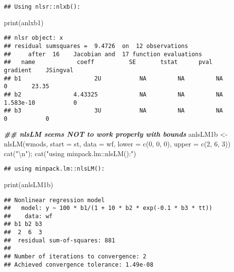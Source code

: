 \documentclass[
]{article}
\newenvironment{Shaded}{\begin{snugshade}}{\end{snugshade}}
\newcommand{\AttributeTok}[1]{\textcolor[rgb]{0.77,0.63,0.00}{#1}}
\newcommand{\DecValTok}[1]{\textcolor[rgb]{0.00,0.00,0.81}{#1}}
\newcommand{\DocumentationTok}[1]{\textcolor[rgb]{0.56,0.35,0.01}{\textbf{\textit{#1}}}}
\newcommand{\FunctionTok}[1]{\textcolor[rgb]{0.00,0.00,0.00}{#1}}
\newcommand{\NormalTok}[1]{#1}
\newcommand{\OtherTok}[1]{\textcolor[rgb]{0.56,0.35,0.01}{#1}}
\newcommand{\SpecialCharTok}[1]{\textcolor[rgb]{0.00,0.00,0.00}{#1}}
\newcommand{\StringTok}[1]{\textcolor[rgb]{0.31,0.60,0.02}{#1}}
\begin{document}
\begin{verbatim}
## Using nlsr::nlxb():
\end{verbatim}

\begin{Shaded}
\begin{Highlighting}[]
\FunctionTok{print}\NormalTok{(anlxb1)}
\end{Highlighting}
\end{Shaded}

\begin{verbatim}
## nlsr object: x 
## residual sumsquares =  9.4726  on  12 observations
##     after  16    Jacobian and  17 function evaluations
##   name            coeff          SE       tstat      pval      gradient    JSingval   
## b1                     2U           NA         NA         NA           0       23.35  
## b2               4.43325            NA         NA         NA   1.583e-10           0  
## b3                     3U           NA         NA         NA           0           0
\end{verbatim}

\begin{Shaded}
\begin{Highlighting}[]
\DocumentationTok{\#\# nlsLM seems NOT to work properly with bounds}
\NormalTok{anlsLM1b }\OtherTok{\textless{}{-}} \FunctionTok{nlsLM}\NormalTok{(wmods, }\AttributeTok{start =}\NormalTok{ st, }\AttributeTok{data =}\NormalTok{ wf, }\AttributeTok{lower =} \FunctionTok{c}\NormalTok{(}\DecValTok{0}\NormalTok{, }\DecValTok{0}\NormalTok{, }\DecValTok{0}\NormalTok{), }\AttributeTok{upper =} \FunctionTok{c}\NormalTok{(}\DecValTok{2}\NormalTok{, }\DecValTok{6}\NormalTok{, }\DecValTok{3}\NormalTok{))}
\FunctionTok{cat}\NormalTok{(}\StringTok{"}\SpecialCharTok{\textbackslash{}n}\StringTok{"}\NormalTok{); }\FunctionTok{cat}\NormalTok{(}\StringTok{"using minpack.lm::nlsLM():"}\NormalTok{)}
\end{Highlighting}
\end{Shaded}

\begin{verbatim}
## using minpack.lm::nlsLM():
\end{verbatim}

\begin{Shaded}
\begin{Highlighting}[]
\FunctionTok{print}\NormalTok{(anlsLM1b)}
\end{Highlighting}
\end{Shaded}

\begin{verbatim}
## Nonlinear regression model
##   model: y ~ 100 * b1/(1 + 10 * b2 * exp(-0.1 * b3 * tt))
##    data: wf
## b1 b2 b3 
##  2  6  3 
##  residual sum-of-squares: 881
## 
## Number of iterations to convergence: 2 
## Achieved convergence tolerance: 1.49e-08
\end{verbatim}
\end{document}

